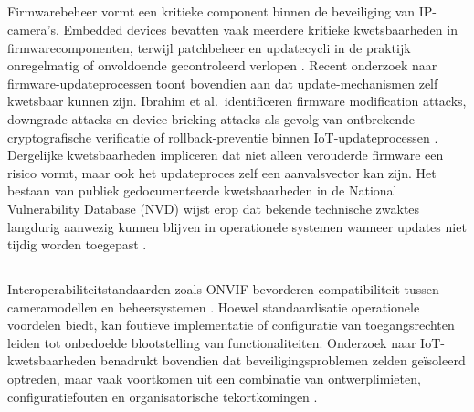 \subsection{}%
\label{subsec:firmware-updates}

Firmwarebeheer vormt een kritieke component binnen de beveiliging van IP-camera’s. Embedded devices bevatten vaak meerdere kritieke kwetsbaarheden in firmwarecomponenten, terwijl patchbeheer en updatecycli in de praktijk onregelmatig of onvoldoende gecontroleerd verlopen \autocite{zhou2023survey,ENISA2024ThreatLandscape}. Recent onderzoek naar firmware-updateprocessen toont bovendien aan dat update-mechanismen zelf kwetsbaar kunnen zijn. Ibrahim et al.\ identificeren firmware modification attacks, downgrade attacks en device bricking attacks als gevolg van ontbrekende cryptografische verificatie of rollback-preventie binnen IoT-updateprocessen \autocite{ibrahim2023aot}. Dergelijke kwetsbaarheden impliceren dat niet alleen verouderde firmware een risico vormt, maar ook het updateproces zelf een aanvalsvector kan zijn. Het bestaan van publiek gedocumenteerde kwetsbaarheden in de National Vulnerability Database (NVD) wijst erop dat bekende technische zwaktes langdurig aanwezig kunnen blijven in operationele systemen wanneer updates niet tijdig worden toegepast \autocite{NVD2025}.

\subsection{}%
\label{subsec:interoperabiliteit}

Interoperabiliteitstandaarden zoals ONVIF bevorderen compatibiliteit tussen cameramodellen en beheersystemen \autocite{ONVIFCoreSpec2025}. Hoewel standaardisatie operationele voordelen biedt, kan foutieve implementatie of configuratie van toegangsrechten leiden tot onbedoelde blootstelling van functionaliteiten. Onderzoek naar IoT-kwetsbaarheden benadrukt bovendien dat beveiligingsproblemen zelden geïsoleerd optreden, maar vaak voortkomen uit een combinatie van ontwerplimieten, configuratiefouten en organisatorische tekortkomingen \autocite{baho2023analysis,Butun2019arXivIoTSecurity}.

\subsection{}%
\label{subsec:synthese-kwetsbaarheden}

